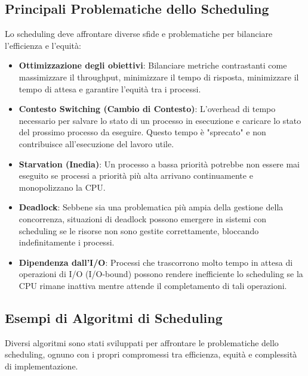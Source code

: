 \subsection{Principali Problematiche dello Scheduling}
Lo scheduling deve affrontare diverse sfide e problematiche per bilanciare l'efficienza e l'equità:
\begin{itemize}
    \item \textbf{Ottimizzazione degli obiettivi}: Bilanciare metriche contrastanti come massimizzare il throughput, minimizzare il tempo di risposta, minimizzare il tempo di attesa e garantire l'equità tra i processi.
    \item \textbf{Contesto Switching (Cambio di Contesto)}: L'overhead di tempo necessario per salvare lo stato di un processo in esecuzione e caricare lo stato del prossimo processo da eseguire. Questo tempo è "sprecato" e non contribuisce all'esecuzione del lavoro utile.
    \item \textbf{Starvation (Inedia)}: Un processo a bassa priorità potrebbe non essere mai eseguito se processi a priorità più alta arrivano continuamente e monopolizzano la CPU.
    \item \textbf{Deadlock}: Sebbene sia una problematica più ampia della gestione della concorrenza, situazioni di deadlock possono emergere in sistemi con scheduling se le risorse non sono gestite correttamente, bloccando indefinitamente i processi.
    \item \textbf{Dipendenza dall'I/O}: Processi che trascorrono molto tempo in attesa di operazioni di I/O (I/O-bound) possono rendere inefficiente lo scheduling se la CPU rimane inattiva mentre attende il completamento di tali operazioni.
\end{itemize}

\subsection{Esempi di Algoritmi di Scheduling}
Diversi algoritmi sono stati sviluppati per affrontare le problematiche dello scheduling, ognuno con i propri compromessi tra efficienza, equità e complessità di implementazione.

